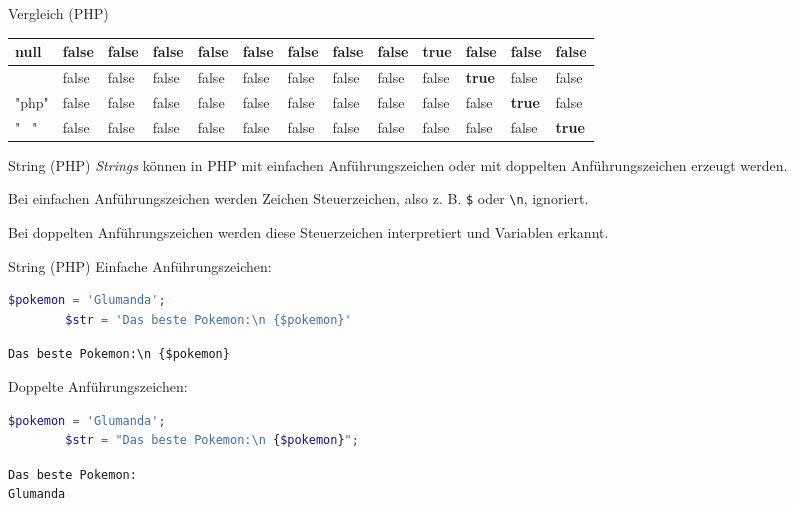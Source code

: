 \begin{bonus}{Vergleich (PHP)}
{\begin{tabular}{|T||T|T|T|T|T|T|T|T|T|T|T|T|}
            \hline
            null  & false         & false         & false         & false         & false         & false         & false         & false         & \textbf{true} & false         & false         & false         \\
            \hline
            []    & false         & false         & false         & false         & false         & false         & false         & false         & false         & \textbf{true} & false         & false         \\
            \hline
            "php" & false         & false         & false         & false         & false         & false         & false         & false         & false         & false         & \textbf{true} & false         \\
            \hline
            " \ " & false         & false         & false         & false         & false         & false         & false         & false         & false         & false         & false         & \textbf{true} \\
            \hline
        \end{tabular}
    }

\end{bonus}

\begin{defi}{String (PHP)}
    \emph{Strings} können in PHP mit einfachen Anführungszeichen oder mit doppelten Anführungszeichen erzeugt werden.

    Bei einfachen Anführungszeichen werden Zeichen Steuerzeichen, also z. B. \texttt{\$} oder \texttt{\textbackslash n}, ignoriert.

    Bei doppelten Anführungszeichen werden diese Steuerzeichen interpretiert und Variablen erkannt.
\end{defi}

\begin{example}{String (PHP)}
    Einfache Anführungszeichen:
    \begin{lstlisting}[language=php]
        $pokemon = 'Glumanda';
        $str = 'Das beste Pokemon:\n {$pokemon}'
    \end{lstlisting}
    \texttt{Das beste Pokemon:\textbackslash n \{\$pokemon\}}

    Doppelte Anführungszeichen:
    \begin{lstlisting}[language=php]
        $pokemon = 'Glumanda';
        $str = "Das beste Pokemon:\n {$pokemon}";
    \end{lstlisting}
    \texttt{Das beste Pokemon: \\ Glumanda}

\end{example}

